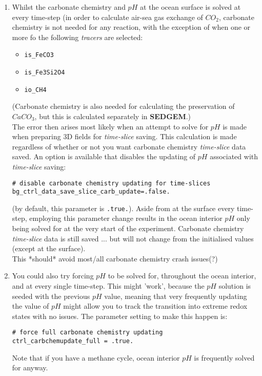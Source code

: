 \documentclass[11pt,fleqn]{book} %
\begin{document}
\begin{enumerate}[noitemsep]
\begin{itemize}[noitemsep]
\begin{enumerate}[noitemsep]
\vspace{1mm}
\item Whilst the carbonate chemistry and \(pH\) at the ocean surface is solved at every time-step (in order to calculate air-sea gas exchange of \(CO_{2}\), carbonate chemistry is not needed for any reaction, with the exception of when one or more fo the following \textit{tracers} are selected:
\vspace{1mm}
\begin{itemize}[noitemsep]
\item \texttt{is\_FeCO3}
\item \texttt{is\_Fe3Si2O4}
\item \texttt{io\_CH4}
\end{itemize}
\vspace{1mm}
(Carbonate chemistry is also needed for calculating the preservation of \(CaCO_{3}\), but this is calculated separately in \textbf{SEDGEM}.)
\\The error then arises most likely when an attempt to solve for \(pH\) is made when preparing 3D fields for \textit{time-slice} saving. This calculation is made regardless of whether or not you want carbonate chemistry \textit{time-slice} data saved. An option is available that disables the updating of \(pH\) associated with \textit{time-slice} saving:
\vspace{1pt}\small\begin{verbatim}
# disable carbonate chemistry updating for time-slices
bg_ctrl_data_save_slice_carb_update=.false.
\end{verbatim}\normalsize\vspace{1pt}
(by default, this parameter is \texttt{.true.}).
Aside from at the surface every time-step, employing this parameter change results in the ocean interior \(pH\) only being solved for at the very start of the experiment. Carbonate chemistry \textit{time-slice} data is still saved ... but will not change from the initialised values (except at the surface).
\\This *should* avoid most/all carbonate chemistry crash issues(?)

\vspace{1mm}
\item You could also try forcing \(pH\) to be solved for, throughout the ocean interior, and at every single time-step. This might 'work', because the \(pH\) solution is seeded with the previous \(pH\) value, meaning that very frequently updating the value of \(pH\) might allow you to track the transition into extreme redox states with no issues. The parameter setting to make this happen is:
\vspace{-0pt}\small\begin{verbatim}
# force full carbonate chemistry updating
ctrl_carbchemupdate_full = .true.
\end{verbatim}\normalsize\vspace{-0pt}
Note that if you have a methane cycle, ocean interior \(pH\) is frequently solved for anyway.


\end{enumerate}
\end{itemize}
\end{enumerate}
\end{document}
